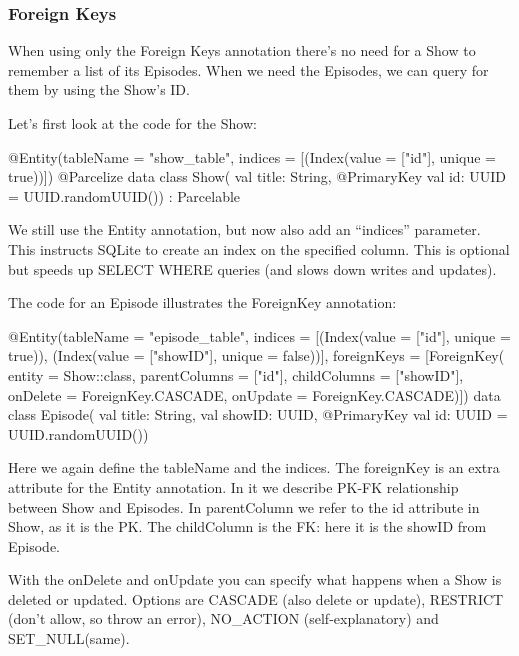 \subsubsection{Foreign Keys}
When using only the Foreign Keys annotation there's no need for a Show to remember a list of its Episodes.
When we need the Episodes, we can query for them by using the Show's ID.

Let's first look at the code for the Show:
\begin{android}
@Entity(tableName = "show_table", indices = [(Index(value = ["id"], unique = true))])
@Parcelize
data class Show(
	val title: String,
	@PrimaryKey
	val id: UUID = UUID.randomUUID()) : Parcelable
\end{android}
We still use the Entity annotation, but now also add an ``indices'' parameter. 
This instructs SQLite to create an index on the specified column.
This is optional but speeds up SELECT WHERE queries (and slows down writes and updates).

The code for an Episode illustrates the ForeignKey annotation:
\begin{android}	
@Entity(tableName = "episode_table",
		indices = [(Index(value = ["id"], unique = true)), (Index(value = ["showID"], unique = false))],
		foreignKeys = [ForeignKey(
			entity = Show::class,
			parentColumns = ["id"],
			childColumns = ["showID"],
			onDelete = ForeignKey.CASCADE,
			onUpdate = ForeignKey.CASCADE)])
data class Episode(
	val title: String,
	val showID: UUID,
	@PrimaryKey
	val id: UUID = UUID.randomUUID())
\end{android}

Here we again define the tableName and the indices.
The foreignKey is an extra attribute for the Entity annotation.
In it we describe PK-FK relationship between Show and Episodes.
In parentColumn we refer to the id attribute in Show, as it is the PK. 
The childColumn is the FK: here it is the showID from Episode. 

With the onDelete and onUpdate you can specify what happens when a Show is deleted or updated.
Options are CASCADE (also delete or update), RESTRICT (don't allow, so throw an error), NO\_ACTION (self-explanatory) and SET\_NULL(same).

